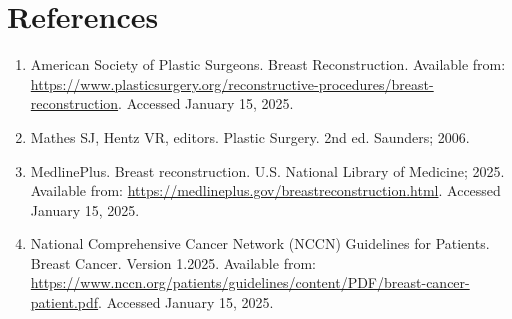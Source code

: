 \section*{References}
\begin{enumerate}
  \item American Society of Plastic Surgeons. Breast Reconstruction. Available from: \url{https://www.plasticsurgery.org/reconstructive-procedures/breast-reconstruction}. Accessed January 15, 2025.
  \item Mathes SJ, Hentz VR, editors. Plastic Surgery. 2nd ed. Saunders; 2006.
  \item MedlinePlus. Breast reconstruction. U.S. National Library of Medicine; 2025. Available from: \url{https://medlineplus.gov/breastreconstruction.html}. Accessed January 15, 2025.
  \item National Comprehensive Cancer Network (NCCN) Guidelines for Patients. Breast Cancer. Version 1.2025. Available from: \url{https://www.nccn.org/patients/guidelines/content/PDF/breast-cancer-patient.pdf}. Accessed January 15, 2025.
\end{enumerate}

\clearpage
